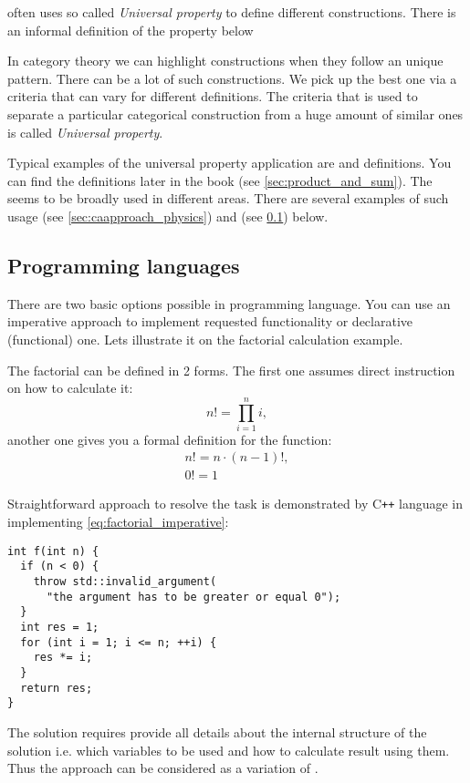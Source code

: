  often uses so called
\textit{Universal property} to define different constructions. 
There is an informal definition of the property below
\begin{definition}
\label{def:universalproperty}
In category theory we can highlight constructions when they follow an
unique pattern. There can be a lot of such constructions. We pick
up the best one via a criteria that can vary for different
definitions. The criteria that is used to separate a particular
categorical construction from a huge amount of similar ones is called
\textit{Universal property}.
\end{definition}
Typical examples of the universal property application are
 and  definitions. You can
find the definitions later in the book (see
\cref{sec:product_and_sum}). The 
seems to be broadly used in different areas. There are several examples of
such  usage (see
\cref{sec:caapproach_physics}) and
 (see
\cref{sec:caapproach_programming_langs}) below.   

\subsection{Programming languages}
\label{sec:caapproach_programming_langs}
There are two basic options possible in programming language. You can
use an imperative approach to implement requested functionality or
declarative (functional) one. Lets illustrate it on the factorial
calculation example.

The factorial can be defined in 2 forms. The first one assumes direct
instruction on how to calculate it:
\begin{equation}
n! = \prod_{i = 1}^n i,
\label{eq:factorial_imperative}
\end{equation}
another one gives you a formal definition for the function:
\begin{eqnarray}
n! = n \cdot \left(n-1\right)!, 
\nonumber \\
0! = 1
\label{eq:factorial_declarative}
\end{eqnarray}

Straightforward approach to resolve the task is demonstrated by
C\texttt{++} language in implementing \eqref{eq:factorial_imperative}: 
\begin{verbatim}
int f(int n) {
  if (n < 0) {
    throw std::invalid_argument(
      "the argument has to be greater or equal 0");
  }
  int res = 1;
  for (int i = 1; i <= n; ++i) {
    res *= i;
  }
  return res;
}
\end{verbatim}
The solution requires provide all details about the internal structure
of the solution i.e. which variables to be used and how to calculate
result using them. Thus the approach can be considered as a variation
of .


